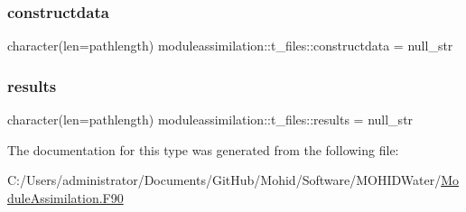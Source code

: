 \subsubsection{\texorpdfstring{constructdata}{constructdata}}
{\footnotesize\ttfamily character(len=pathlength) moduleassimilation\+::t\+\_\+files\+::constructdata = null\+\_\+str\hspace{0.3cm}{\ttfamily [private]}}

\mbox{\label{structmoduleassimilation_1_1t__files_ac4ce8d183913f4c337e557d90e079f83}} 
\subsubsection{\texorpdfstring{results}{results}}
{\footnotesize\ttfamily character(len=pathlength) moduleassimilation\+::t\+\_\+files\+::results = null\+\_\+str\hspace{0.3cm}{\ttfamily [private]}}



The documentation for this type was generated from the following file\+:\begin{DoxyCompactItemize}
\item 
C\+:/\+Users/administrator/\+Documents/\+Git\+Hub/\+Mohid/\+Software/\+M\+O\+H\+I\+D\+Water/\mbox{\hyperlink{_module_assimilation_8_f90}{Module\+Assimilation.\+F90}}\end{DoxyCompactItemize}
